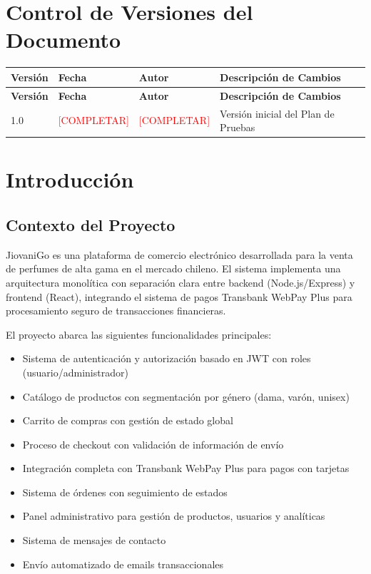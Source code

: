 \documentclass[12pt,a4paper]{article}
\begin{document}
\newpage
\tableofcontents
\newpage

\section{Control de Versiones del Documento}

\begin{longtable}{|p{2cm}|p{3cm}|p{4cm}|p{5cm}|}
\hline
\textbf{Versión} & \textbf{Fecha} & \textbf{Autor} & \textbf{Descripción de Cambios} \\
\hline
\endfirsthead
\hline
\textbf{Versión} & \textbf{Fecha} & \textbf{Autor} & \textbf{Descripción de Cambios} \\
\hline
\endhead
1.0 & \textcolor{red}{[COMPLETAR]} & \textcolor{red}{[COMPLETAR]} & Versión inicial del Plan de Pruebas \\
\hline
\end{longtable}

\section{Introducción}

\subsection{Contexto del Proyecto}

JiovaniGo es una plataforma de comercio electrónico desarrollada para la venta de perfumes de alta gama en el mercado chileno. El sistema implementa una arquitectura monolítica con separación clara entre backend (Node.js/Express) y frontend (React), integrando el sistema de pagos Transbank WebPay Plus para procesamiento seguro de transacciones financieras.

El proyecto abarca las siguientes funcionalidades principales:
\begin{itemize}
    \item Sistema de autenticación y autorización basado en JWT con roles (usuario/administrador)
    \item Catálogo de productos con segmentación por género (dama, varón, unisex)
    \item Carrito de compras con gestión de estado global
    \item Proceso de checkout con validación de información de envío
    \item Integración completa con Transbank WebPay Plus para pagos con tarjetas
    \item Sistema de órdenes con seguimiento de estados
    \item Panel administrativo para gestión de productos, usuarios y analíticas
    \item Sistema de mensajes de contacto
    \item Envío automatizado de emails transaccionales
\end{itemize}
\end{document}

